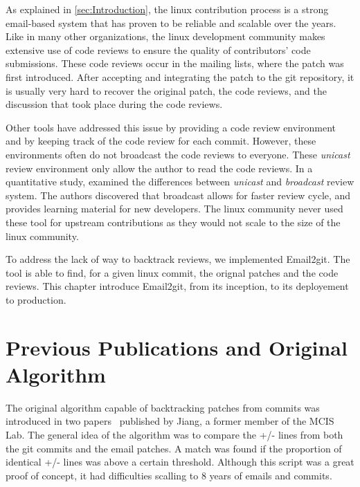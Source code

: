 \label{sec:Theme2}

As explained in \autoref{sec:Introduction}, the linux contribution process is a strong email-based system that has proven to be reliable and scalable over the years. Like in many other organizations, the linux development community makes extensive use of code reviews to ensure the quality of contributors' code submissions. These code reviews occur in the mailing lists, where the patch was first introduced. After accepting and integrating the patch to the git repository, it is usually very hard to recover the original patch, the code reviews, and the discussion that took place during the code reviews. 

Other tools have addressed this issue by providing a code review environment and by keeping track of the code review for each commit. However, these environments often do not broadcast the code reviews to everyone. These \textit{unicast} review environment only allow the author to read the code reviews. In a quantitative study, \citep{armstrong} examined the differences between \textit{unicast} and \textit{broadcast} review system. The authors discovered that broadcast allows for faster review cycle, and provides learning material for new developers. The linux community never used these tool for upstream contributions as they would not scale to the size of the linux community. 


To address the lack of way to backtrack reviews, we implemented Email2git. The tool is able to find, for a given linux commit, the orignal patches and the code reviews. This chapter introduce Email2git, from its inception, to its deployement to production. 

\section{Previous Publications and Original Algorithm}

The original algorithm capable of backtracking patches from commits was introduced in two papers~\citep{msr13jojo,jiang14} published by Jiang, a former member of the MCIS Lab. The general idea of the algorithm was to compare the +/- lines from both the git commits and the email patches. A match was found if the proportion of identical +/- lines was above a certain threshold. Although this script was a great proof of concept, it had difficulties scalling to 8 years of emails and commits. 


